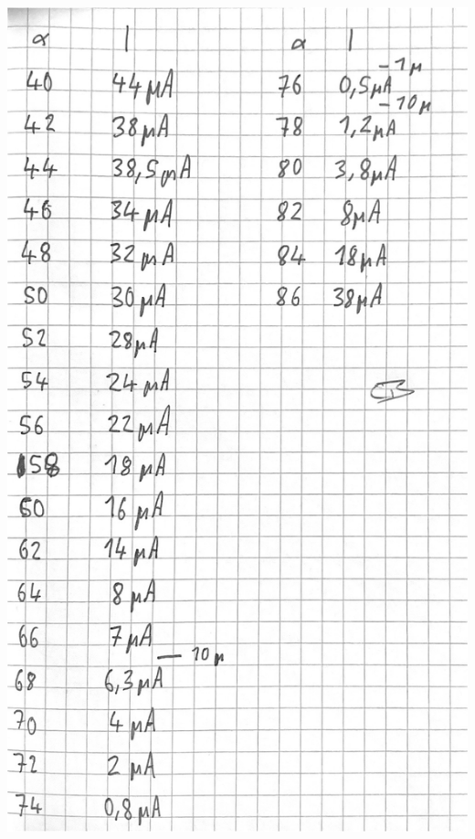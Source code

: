 \vfill\null
\newpage
\null\vfill
\includegraphics[width=0.7\linewidth]{content/messung/5.jpg}
\vfill\null

